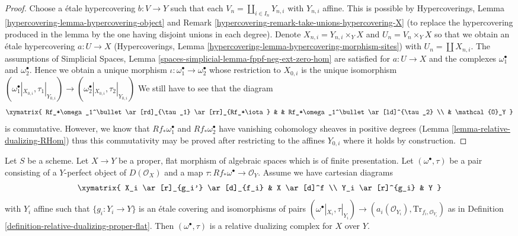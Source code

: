 \begin{proof}
\medskip\noindent
Choose a \'etale hypercovering $b : V \to Y$ such that each
$V_n = \coprod_{i \in I_n} Y_{n, i}$ with $Y_{n, i}$ affine.
This is possible by Hypercoverings, Lemma
\ref{hypercovering-lemma-hypercovering-object} and
Remark \ref{hypercovering-remark-take-unions-hypercovering-X}
(to replace the hypercovering produced
in the lemma by the one having disjoint unions in each degree).
Denote $X_{n, i} = Y_{n, i} \times_Y X$ and $U_n = V_n \times_Y X$
so that we obtain an \'etale hypercovering
$a : U \to X$ (Hypercoverings, Lemma
\ref{hypercovering-lemma-hypercovering-morphism-sites})
with $U_n = \coprod X_{n, i}$.
The assumptions of Simplicial Spaces, Lemma
\ref{spaces-simplicial-lemma-fppf-neg-ext-zero-hom}
are satisfied for $a : U \to X$ and the complexes
$\omega_1^\bullet$ and $\omega_2^\bullet$.
Hence we obtain a unique morphism
$\iota : \omega_1^\bullet \to \omega_2^\bullet$
whose restriction to $X_{0, i}$ is the unique
isomorphism $(\omega_1^\bullet|_{X_{0, i}}, \tau_1|_{Y_{0, i}}) \to
(\omega_2^\bullet|_{X_{0, i}}, \tau_2|_{Y_{0, i}})$
We still have to see that the diagram
$$
\xymatrix{
Rf_*\omega_1^\bullet \ar[rd]_{\tau_1} \ar[rr]_{Rf_*\iota} & &
Rf_*\omega_1^\bullet \ar[ld]^{\tau_2} \\
& \mathcal{O}_Y
}
$$
is commutative. However, we know that $Rf_*\omega_1^\bullet$ and
$Rf_*\omega_2^\bullet$ have vanishing cohomology sheaves in positive
degrees (Lemma \ref{lemma-relative-dualizing-RHom})
thus this commutativity may be proved after
restricting to the affines $Y_{0, i}$ where it holds by construction.
\end{proof}

\begin{lemma}
\label{lemma-covering-enough}
Let $S$ be a scheme. Let $X \to Y$ be a proper, flat morphism of
algebraic spaces which is of finite presentation.
Let $(\omega^\bullet, \tau)$ be a pair consisting
of a $Y$-perfect object of $D(\mathcal{O}_X)$ and a map
$\tau : Rf_*\omega^\bullet \to \mathcal{O}_Y$.
Assume we have cartesian diagrams
$$
\xymatrix{
X_i \ar[r]_{g_i'} \ar[d]_{f_i} & X \ar[d]^f \\
Y_i \ar[r]^{g_i} & Y
}
$$
with $Y_i$ affine such that $\{g_i : Y_i \to Y\}$ is an \'etale covering
and isomorphisms of pairs $(\omega^\bullet|_{X_i}, \tau|_{Y_i})
\to (a_i(\mathcal{O}_{Y_i}), \text{Tr}_{f_i, \mathcal{O}_{Y_i}})$
as in Definition \ref{definition-relative-dualizing-proper-flat}.
Then $(\omega^\bullet, \tau)$ is a relative dualizing complex for $X$ over $Y$.
\end{lemma}

